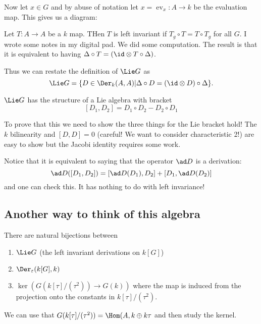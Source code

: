 \documentclass[12pt]{article}
\begin{document}
Now let $x\in G$ and by abuse of notation let $x=\operatorname{ev}_x:A\to k$ be the evaluation map. This gives us a diagram:
\begin{figure}[h]
\end{figure}

Let $T:A\to A$ be a $k$ map. THen $T$ is left invariant if $T_g\circ T=T\circ T_g$ for all $G$. 
I wrote some notes in my digital pad. We did some computation. The result is that it is equivalent to having $\Delta\circ T=(\id\otimes T\circ \Delta)$.

Thus we can restate the definition of $\Lie G$ as 
\[\Lie G=\{D\in\Der_k(A,A)|\Delta\circ D=(\id\otimes D)\circ \Delta\}.\]
\begin{lem}
	$\Lie G$ has the structure of a Lie algebra with bracket 
	\[[D_1,D_2]=D_1\circ D_2-D_2\circ D_1\]
\end{lem}
To prove that this we need to show the three things for the Lie bracket hold! The $k$ bilinearity and $[D,D]=0$ (careful! We want to consider characteristic 2!)
are easy to show but the Jacobi identity requires some work.

Notice that it is equivalent to saying that the operator $\ad D$ is a derivation:
\[\ad D([D_1,D_2])=[\ad D(D_1),D_2]+[D_1,\ad D(D_2)]\]
and one can check this. It has nothing to do with left invariance!

\subsection{Another way to think of this algebra}
\begin{lem}
	There are natural bijections between 
	\begin{enumerate}
		\item $\Lie G$ (the left invariant derivations on $k[G]$)
		\item $\Der_\varepsilon(k[G],k)$
		\item $\ker (G(k[\tau]/(\tau^2))\to G(k))$ where the map is induced from the projection onto the constants in $k[\tau]/(\tau^2)$.
	\end{enumerate}
\end{lem}
\begin{prf}
	We can use that $G(k[\tau]/(\tau^2))=\Hom(A,k\oplus k\tau$ and then study the kernel.
\end{prf}
\end{document}
